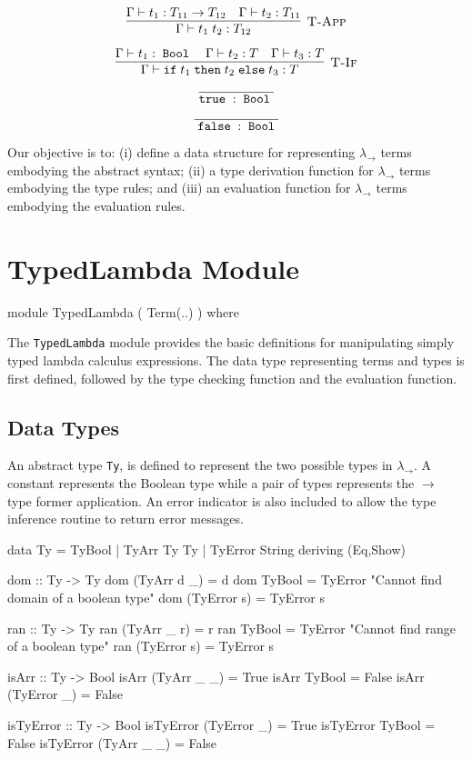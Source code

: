 \documentclass[10pt]{article}
\newcommand{\IF}{\ensuremath{\mathtt{ if \;}}}
\newcommand{\THEN}{\ensuremath{\mathtt{\; then \;}}}
\newcommand{\ELSE}{\ensuremath{\mathtt{\; else \;}}}
\newcommand{\TRUE}{\ensuremath{\mathtt{ true \;}}}
\newcommand{\FALSE}{\ensuremath{\mathtt{\; false \;}}}
\newcommand{\BOOL}{\ensuremath{\mathtt{\; Bool \;}}}
\begin{document}
\[\vcenter{\infer[\textsc{T-App}]
  {\Gamma\vdash t_1\; t_2 : T_{12}}
  {\Gamma\vdash t_1 : T_{11}\rightarrow T_{12} & \Gamma\vdash t_2:T_{11}}}
\]

\[\vcenter{\infer[\textsc{T-If}]
  {\Gamma\vdash \IF t_1 \THEN t_2 \ELSE t_3 : T}
  {\Gamma\vdash t_1 : \BOOL & \Gamma\vdash t_2 : T & \Gamma\vdash t_3 : T}}
\]

\[\vcenter{\infer{\TRUE:\BOOL}{}}\]

\[\vcenter{\infer{\FALSE:\BOOL}{}}\]

Our objective is to: (i) define a data structure for representing
$\lambda_\rightarrow$ terms embodying the abstract syntax; (ii) a type
derivation function for $\lambda_\rightarrow$ terms embodying the type
rules; and (iii) an evaluation function for $\lambda_\rightarrow$
terms embodying the evaluation rules.

\section{TypedLambda Module}

\begin{code}
  module TypedLambda ( Term(..) )
      where
\end{code}

The \texttt{TypedLambda} module provides the basic definitions for
manipulating simply typed lambda calculus expressions.  The data type
representing terms and types is first defined, followed by the type
checking function and the evaluation function.

\subsection{Data Types}

An abstract type \texttt{Ty}, is defined to represent the two possible
types in $\lambda_{\rightarrow}$.  A constant represents the Boolean
type while a pair of types represents the $\rightarrow$ type former
application.  An error indicator is also included to allow the type
inference routine to return error messages.

\begin{code}
  data Ty =
      TyBool |
      TyArr Ty Ty |
      TyError String deriving (Eq,Show)

  dom :: Ty -> Ty
  dom (TyArr d _) = d
  dom TyBool = TyError "Cannot find domain of a boolean type"
  dom (TyError s) = TyError s

  ran :: Ty -> Ty
  ran (TyArr _ r) = r
  ran TyBool = TyError "Cannot find range of a boolean type"
  ran (TyError s) = TyError s

  isArr :: Ty -> Bool
  isArr (TyArr _ _) = True
  isArr TyBool = False
  isArr (TyError _) = False

  isTyError :: Ty -> Bool
  isTyError (TyError _) = True
  isTyError TyBool = False
  isTyError (TyArr _ _) = False
\end{code}
\end{document}

